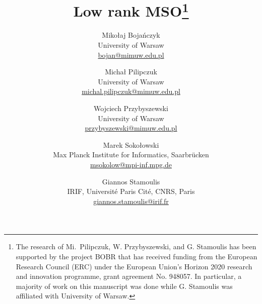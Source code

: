 \documentclass[11pt]{article}
\begin{document}
\title{{\huge{Low rank MSO}}\thanks{%
The research of Mi.\ Pilipczuk, W. Przybyszewski, and G. Stamoulis has been supported by the project BOBR that has received funding from the European Research Council (ERC) under the European Union's Horizon 2020 research and innovation programme, grant agreement No. 948057. In particular, a majority of work on this manuscript was done while G. Stamoulis was affiliated with University of Warsaw.}}

\author{
Miko{\l}aj Boja\'nczyk\\\small{University of Warsaw}\\\small{\href{bojan@mimuw.edu.pl}{bojan@mimuw.edu.pl}}
\and
Micha{\l} Pilipczuk\\\small{University of Warsaw}\\\small{\href{michal.pilipczuk@mimuw.edu.pl}{michal.pilipczuk@mimuw.edu.pl}}
\and
Wojciech Przybyszewski\\\small{University of Warsaw}\\\small{\href{przybyszewski@mimuw.edu.pl}{przybyszewski@mimuw.edu.pl}}
\and
Marek Soko\l{}owski\\\small{Max Planck Institute for Informatics, Saarbr\"ucken}\\\small{\href{msokolow@mpi-inf.mpg.de}{msokolow@mpi-inf.mpg.de}}
\and
Giannos Stamoulis\\\small{IRIF, Université Paris Cité, CNRS, Paris}\\\small{\href{giannos.stamoulis@irif.fr}{giannos.stamoulis@irif.fr}}
}

\date{}
\end{document}
